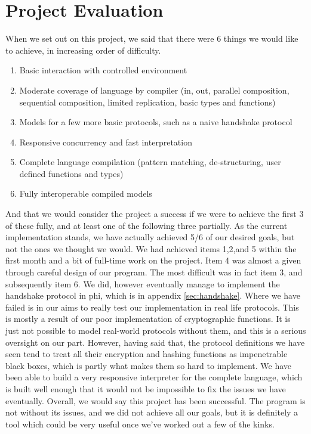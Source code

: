 \section{Project Evaluation}

When we set out on this project, we said that there were 6 things we would like to achieve, in increasing order of difficulty.
\begin{enumerate}
    \item Basic interaction with controlled environment
    \item Moderate coverage of language by compiler (in, out, parallel composition, sequential composition, limited replication, basic types and functions) 
    \item Models for a few more basic protocols, such as a naive handshake protocol
    \item Responsive concurrency and fast interpretation
    \item Complete language compilation (pattern matching, de-structuring, user defined functions and types)
    \item Fully interoperable compiled models
\end{enumerate}
And that we would consider the project a success if we were to achieve the first 3 of these fully, and at least one of the following three partially.
As the current implementation stands, we have actually achieved 5/6 of our desired goals, but not the ones we thought we would. We had achieved items 1,2,and 5 within the first month and a bit of full-time work on the project. Item 4 was almost a given through careful design of our program. The most difficult was in fact item 3, and subsequently item 6. We did, however eventually manage to implement the handshake protocol in phi, which is in appendix \ref{sec:handshake}.
Where we have failed is in our aims to really test our implementation in real life protocols. This is mostly a result of our poor implementation of cryptographic functions. It is just not
possible to model real-world protocols without them, and this is a serious oversight on our part. However, having said that, the protocol definitions we have seen tend to treat all their encryption and hashing functions as impenetrable black boxes, which is partly what makes them so hard to implement.
We have been able to build a very responsive interpreter for the complete language, which is built well enough that it would not be impossible to fix the issues we have eventually.
Overall, we would say this project has been successful. The program is not without its issues, and we did not achieve all our goals, but it is definitely a tool which could be very useful once we've worked out a few of the kinks.

